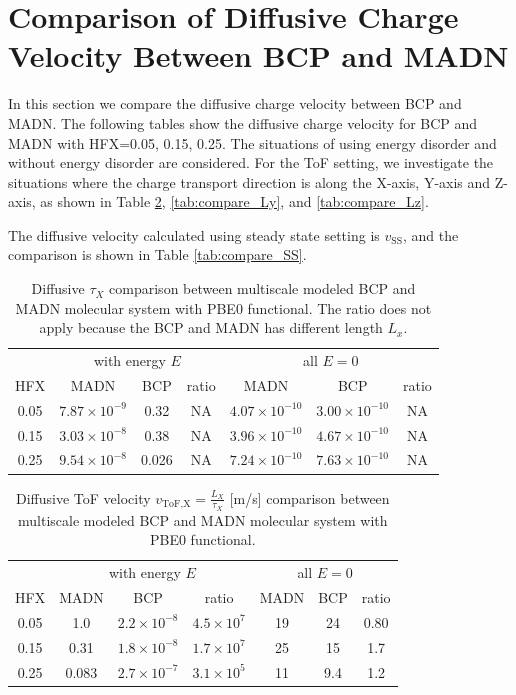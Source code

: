 \documentclass[letterpaper,12pt]{article}
\begin{document}
\section{Comparison of Diffusive Charge Velocity Between BCP and MADN}
In this section we compare the diffusive charge velocity between BCP and MADN. 
The following tables show the diffusive charge velocity for BCP and MADN with HFX=0.05, 0.15, 0.25. The situations of using energy disorder and without energy disorder are considered.
For the ToF setting, we investigate the situations where the charge transport direction is along the X-axis, Y-axis and Z-axis, as shown in Table \ref{tab:compare_Lx}, \ref{tab:compare_Ly}, and \ref{tab:compare_Lz}. 

The diffusive velocity calculated using steady state setting is $v_\text{SS}$, and the comparison is shown in Table \ref{tab:compare_SS}.
\begin{table}[H]
\centering
\begin{tabular}{c c c c c c c}
    \toprule
     &
        \multicolumn{3}{c}{ with energy $E$} &
        \multicolumn{3}{c}{all $E=0$}  \\
    HFX & MADN & BCP & ratio & MADN & BCP & ratio  \\
    \cmidrule(r){1-7}
    0.05 & $7.87 \times 10^{-9}$ & 0.32 & NA & $4.07 \times 10^{-10}$ & $3.00 \times 10^{-10}$ & NA \\
    0.15 & $3.03 \times 10^{-8}$ & 0.38 & NA & $3.96 \times 10^{-10}$ & $4.67 \times 10^{-10}$ & NA \\
    0.25 & $9.54 \times 10^{-8}$ & 0.026 & NA & $7.24 \times 10^{-10}$ & $7.63 \times 10^{-10}$ & NA \\
    \bottomrule
    \end{tabular}
    \caption{Diffusive $\tau_X$ comparison between multiscale modeled BCP and MADN molecular system with PBE0 functional. The ratio does not apply because the BCP and MADN has different length $L_x$.}
    \label{tab:compare}
\end{table}

\begin{table}[H]
\centering
\begin{tabular}{c c c c c c c}
    \toprule
        &
        \multicolumn{3}{c}{ with energy $E$} &
        \multicolumn{3}{c}{all $E=0$}  \\
    HFX & MADN & BCP & ratio & MADN & BCP & ratio  \\
    \cmidrule(r){1-7}
    0.05 & 1.0 & $2.2 \times 10^{-8}$ & $4.5 \times 10^{7}$ & 19 & 24 & 0.80 \\
    0.15 & 0.31 & $1.8 \times 10^{-8}$ & $1.7 \times 10^{7}$ & 25 & 15 & 1.7 \\
    0.25 & 0.083 & $2.7 \times 10^{-7}$ & $3.1 \times 10^{5}$ & 11 & 9.4 & 1.2 \\
    \bottomrule
    \end{tabular}
    \caption{Diffusive ToF velocity $v_\text{ToF,X}=\frac{L_X}{\tau_X}$ [m/s] comparison between multiscale modeled BCP and MADN molecular system with PBE0 functional. }
    \label{tab:compare_Lx}
\end{table}
\end{document}
